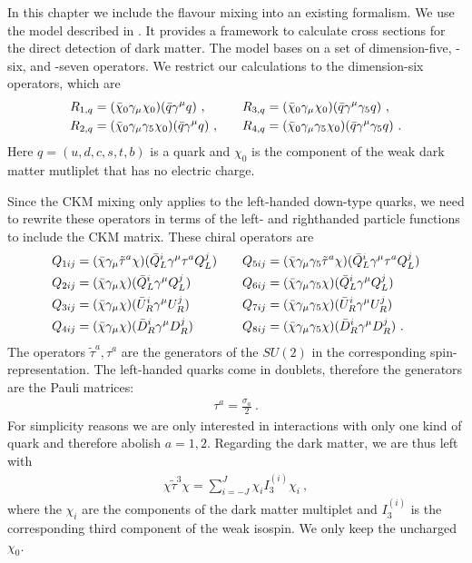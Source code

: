 In this chapter we include the flavour mixing into an existing formalism. We use the model described in \cite{ChiralEFT}. It provides a framework to calculate cross sections for the direct detection of dark matter. The model bases on a set of dimension-five, -six, and -seven operators. We restrict our calculations to the dimension-six operators, which are
\begin{align}\label{eq:normal}
	R_{1,q} &= (\bar{\chi}_0\gamma_\mu\chi_0)(\bar{q}\gamma^\mu q) \ , && &R_{3,q} &= (\bar{\chi}_0\gamma_\mu\chi_0)(\bar{q}\gamma^\mu\gamma_5q) \ , \notag \\
	R_{2,q} &= (\bar{\chi}_0\gamma_\mu\gamma_5\chi_0)(\bar{q}\gamma^\mu q) \ , &&	&R_{4,q} &= (\bar{\chi}_0\gamma_\mu\gamma_5\chi_0)(\bar{q}\gamma^\mu\gamma_5q) \ .
\end{align}
Here $q=(u,d,c,s,t,b)$ is a quark and $\chi_0$ is the component of the weak dark matter mutliplet that has no electric charge.


Since the CKM mixing only applies to the left-handed down-type quarks, we need to rewrite these operators in terms of the left- and righthanded particle functions to include the CKM matrix. These chiral operators are
\begin{align}\label{eq:chiral}
	Q_{1ij} &= (\bar{\chi}\gamma_\mu\tilde{\tau}^a\chi)(\bar{Q}_L^i\gamma^\mu \tau^aQ_L^j) && &Q_{5ij} &= (\bar{\chi}\gamma_\mu\gamma_5\tilde{\tau}^a\chi)(\bar{Q}_L^i\gamma^\mu \tau^aQ_L^j)\notag \\
	Q_{2ij} &= (\bar{\chi}\gamma_\mu\chi)(\bar{Q}_L^i\gamma^\mu Q_L^j) && &Q_{6ij} &= (\bar{\chi}\gamma_\mu\gamma_5\chi)(\bar{Q}_L^i\gamma^\mu Q_L^j)\notag \\
	Q_{3ij} &= (\bar{\chi}\gamma_\mu\chi)(\bar{U}_R^i\gamma^\mu U_R^j) && &Q_{7ij} &= (\bar{\chi}\gamma_\mu\gamma_5\chi)(\bar{U}_R^i\gamma^\mu U_R^j)\notag \\
	Q_{4ij} &= (\bar{\chi}\gamma_\mu\chi)(\bar{D}_R^i\gamma^\mu D_R^j) && &Q_{8ij} &= (\bar{\chi}\gamma_\mu\gamma_5\chi)(\bar{D}_R^i\gamma^\mu D_R^j) \ .
\end{align}
The operators $\tilde{\tau}^a,\tau^a$ are the generators of the $SU(2)$ in the corresponding spin-representation. The left-handed quarks come in doublets, therefore the generators are the Pauli matrices:
\begin{align}
	\tau^a = \frac{\sigma_a}{2} \ .
\end{align}
For simplicity reasons we are only interested in interactions with only one kind of quark and therefore abolish $a=1,2$. Regarding the dark matter, we are thus left with
\begin{align}
	\chi\tilde{\tau}^3\chi = \sum_{i=-J}^{J}\chi_iI_3^{(i)}\chi_i \ ,
\end{align}
where the $\chi_i$ are the components of the dark matter multiplet and $I_3^{(i)}$ is the corresponding third component of the weak isospin. We only keep the uncharged $\chi_0$.



